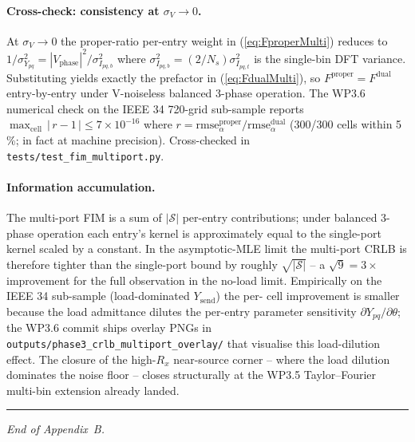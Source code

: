\documentclass[11pt,a4paper]{article}
\begin{document}
\paragraph{Cross-check: consistency at $\sigma_V\to 0$.}
At $\sigma_V\to 0$ the proper-ratio per-entry weight in
(\ref{eq:FproperMulti}) reduces to
$1/\sigma_{Y_{pq}}^{2} = |V_{\mathrm{phase}}|^{2}/\sigma_{I_{pq,b}}^{2}$
where $\sigma_{I_{pq,b}}^{2} = (2/N_s)\sigma_{I_{pq,t}}^{2}$ is
the single-bin DFT variance.  Substituting yields exactly the
prefactor in (\ref{eq:FdualMulti}), so $F^{\mathrm{proper}} =
F^{\mathrm{dual}}$ entry-by-entry under V-noiseless balanced
3-phase operation.  The WP3.6 numerical check on the IEEE 34
720-grid sub-sample reports $\max_{\mathrm{cell}}\,|\,r-1\,| \le
7\!\times\!10^{-16}$ where
$r = \mathrm{rmse}_\alpha^{\mathrm{proper}} /
\mathrm{rmse}_\alpha^{\mathrm{dual}}$ (300/300 cells within
5\,\%; in fact at machine precision).  Cross-checked in
\texttt{tests/test\_fim\_multiport.py}.

\paragraph{Information accumulation.}
The multi-port FIM is a sum of $|\mathcal{S}|$ per-entry
contributions; under balanced 3-phase operation each entry's kernel
is approximately equal to the single-port kernel scaled by a
constant.  In the asymptotic-MLE limit the multi-port CRLB is
therefore tighter than the single-port bound by roughly
$\sqrt{|\mathcal{S}|}$ -- a $\sqrt{9}=3\!\times$ improvement for
the full observation in the no-load limit.  Empirically on the
IEEE 34 sub-sample (load-dominated $Y_{\mathrm{send}}$) the per-
cell improvement is smaller because the load admittance dilutes
the per-entry parameter sensitivity
$\partial Y_{pq}/\partial\theta$; the WP3.6 commit ships overlay
PNGs in \texttt{outputs/phase3\_crlb\_multiport\_overlay/} that
visualise this load-dilution effect.  The closure of the high-$R_x$
near-source corner -- where the load dilution dominates the noise
floor -- closes structurally at the WP3.5 Taylor--Fourier
multi-bin extension already landed.

\bigskip\hrule\bigskip
\noindent\textit{End of Appendix~B.}



\end{document}
